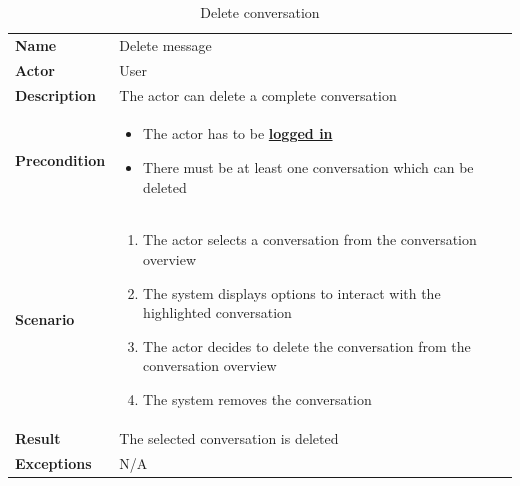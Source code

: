 \begin{table}[ht]
    \caption{Delete conversation}
    \begin{tabular}{|L{5cm}|L{10cm}|}
        \toprule
        \textbf{Name}        & Delete message                               \\
        \textbf{Actor}       & User                                         \\
        \textbf{Description} & The actor can delete a complete conversation \\
        \textbf{Precondition} &
        \vspace{-0.75cm}
        \begin{itemize}
            \setlength\itemsep{-0.5em}
            \item The actor has to be \textbf{\hyperref[tab:table8]{logged in}}
            \item There must be at least one conversation which can be deleted
        \end{itemize} \\[-0.5cm]
        \textbf{Scenario} &
        \vspace{-0.75cm}
        \begin{enumerate}
            \setlength\itemsep{-0.5em}
            \item The actor selects a conversation from the conversation overview
            \item The system displays options to interact with the highlighted conversation
            \item The actor decides to delete the conversation from the conversation overview
            \item The system removes the conversation
        \end{enumerate} \\[-0.5cm]
        \textbf{Result}      & The selected conversation is deleted         \\
        \textbf{Exceptions}  & N/A                                          \\
        \bottomrule
    \end{tabular}
    \label{tab:table21}
\end{table}

